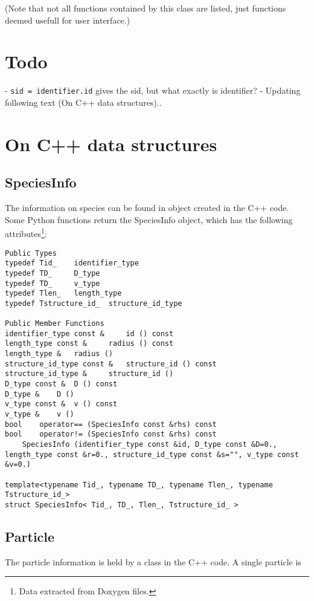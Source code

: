 \documentclass[a4paper,10pt]{article}
\begin{document}
(Note that not all functions contained by this class are listed, just functions deemed usefull for user interface.)

\section{Todo}

- \texttt{sid = identifier.id} gives the sid, but what exactly is identifier?
- Updating following text (On C++ data structures)..

\section{On C++ data structures}

\subsection{SpeciesInfo}

The information on species can be found in object created in the C++ code. Some Python functions return the SpeciesInfo object, which has the following attributes\footnote{Data extracted from Doxygen files.}:

\begin{verbatim}
Public Types
typedef Tid_ 	identifier_type
typedef TD_ 	D_type
typedef TD_ 	v_type
typedef Tlen_ 	length_type
typedef Tstructure_id_ 	structure_id_type

Public Member Functions
identifier_type const & 	id () const
length_type const & 	radius () const
length_type & 	radius ()
structure_id_type const & 	structure_id () const
structure_id_type & 	structure_id ()
D_type const & 	D () const
D_type & 	D ()
v_type const & 	v () const
v_type & 	v ()
bool 	operator== (SpeciesInfo const &rhs) const
bool 	operator!= (SpeciesInfo const &rhs) const
 	SpeciesInfo (identifier_type const &id, D_type const &D=0., length_type const &r=0., structure_id_type const &s="", v_type const &v=0.)

template<typename Tid_, typename TD_, typename Tlen_, typename Tstructure_id_>
struct SpeciesInfo< Tid_, TD_, Tlen_, Tstructure_id_ >
\end{verbatim}

\subsection{Particle}

The particle information is held by a class in the C++ code. A single particle is 
\end{document}
